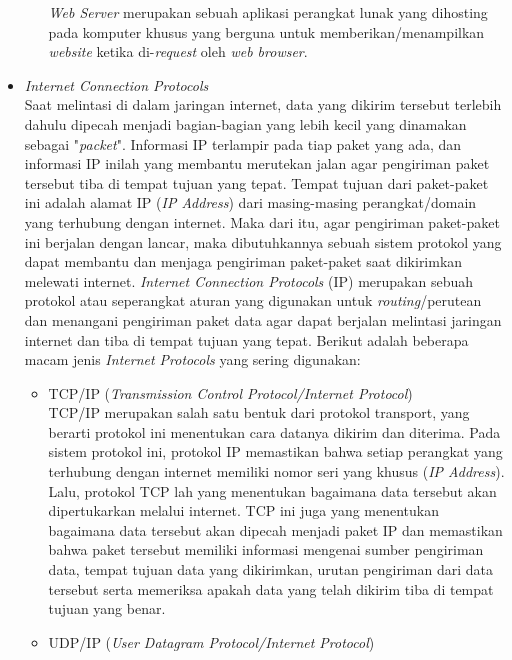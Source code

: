 \documentclass[a4paper]{article}
\begin{document}
\begin{itemize}
\begin{itemize}
        \textit{Web Server} merupakan sebuah aplikasi perangkat lunak yang dihosting pada komputer khusus yang berguna untuk memberikan/menampilkan \textit{website} ketika di-\textit{request} oleh \textit{web browser}\autocite{web-browsers}.
    \end{itemize}
    \item \textit{Internet Connection Protocols}\\
    Saat melintasi di dalam jaringan internet, data yang dikirim tersebut terlebih dahulu dipecah menjadi bagian-bagian yang lebih kecil yang dinamakan sebagai "\textit{packet}". Informasi IP terlampir pada tiap paket yang ada, dan informasi IP inilah yang membantu merutekan jalan agar pengiriman paket tersebut tiba di tempat tujuan yang tepat. Tempat tujuan dari paket-paket ini adalah alamat IP (\textit{IP Address}) dari masing-masing perangkat/domain yang terhubung dengan internet\autocite{what-is-internet-protocol}. Maka dari itu, agar pengiriman paket-paket ini berjalan dengan lancar, maka dibutuhkannya sebuah sistem protokol yang dapat membantu dan menjaga pengiriman paket-paket saat dikirimkan melewati internet.
    \textit{Internet Connection Protocols} (IP) merupakan sebuah protokol atau seperangkat aturan yang digunakan untuk \textit{routing}/perutean dan menangani pengiriman paket data agar dapat berjalan melintasi jaringan internet dan tiba di tempat tujuan yang tepat\autocite{what-is-internet-protocol}. Berikut adalah beberapa macam jenis \textit{Internet Protocols} yang sering digunakan:
    \begin{itemize}
        \item TCP/IP (\textit{Transmission Control Protocol/Internet Protocol})\\
        TCP/IP merupakan salah satu bentuk dari protokol transport, yang berarti protokol ini menentukan cara datanya dikirim dan diterima\autocite{what-is-internet-protocol}. Pada sistem protokol ini, protokol IP memastikan bahwa setiap perangkat yang terhubung dengan internet memiliki nomor seri yang khusus (\textit{IP Address}). Lalu, protokol TCP lah yang menentukan bagaimana data tersebut akan dipertukarkan melalui internet. TCP ini juga yang menentukan bagaimana data tersebut akan dipecah menjadi paket IP dan memastikan bahwa paket tersebut memiliki informasi mengenai sumber pengiriman data, tempat tujuan data yang dikirimkan, urutan pengiriman dari data tersebut serta memeriksa apakah data yang telah dikirim tiba di tempat tujuan yang benar\autocite{types-of-internet-protocols}.
        \item UDP/IP (\textit{User Datagram Protocol/Internet Protocol})\\

\end{itemize}
\end{itemize}
\end{document}
